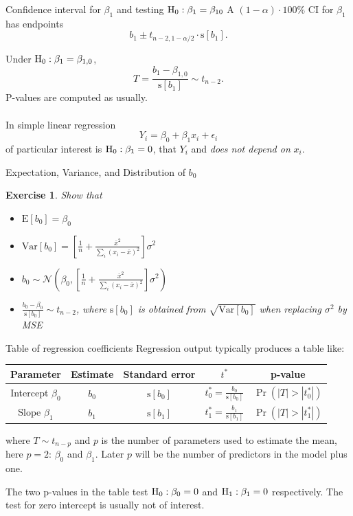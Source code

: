 \documentclass{beamer}
\newcommand{\E}{\mathrm{E}}
\newcommand{\Var}{\mathrm{Var}}
\newcommand{\s}{\mathrm{s}}
\newtheorem{exe}{Exercise}
\begin{document}
\begin{frame}{Confidence interval for $\beta_1$ and testing $\rm{H}_0:\beta_1=\beta_{10}$}
A $(1-\alpha)\cdot100\%$ CI for $\beta_1$ has endpoints
$$
b_1\pm t_{n-2,1-\alpha/2}\cdot\s[b_1].
$$

\pause Under $\rm{H}_0:\beta_1={\beta_{1,0}}$,
$$
T=\frac{b_1-\beta_{1,0}}{\s[b_1]}\sim t_{n-2}.
$$
\pause P-values are computed as usually.\\~\\

\pause In simple linear regression
$$
Y_i=\beta_0+\beta_1 x_i+\epsilon_i
$$
of particular interest is $\rm{H}_0:\beta_1=0$, that $Y_i$ and \textit{does not depend on} $x_i$. 
\end{frame}

\begin{frame}{Expectation, Variance, and Distribution of $b_0$}
\begin{exe}
Show that
\begin{itemize}
    \item $\E[b_0]=\beta_0$
    \item<2->$\Var[b_0]=\left[\frac1n+\frac{\bar{x}^2}{\sum_i(x_i-\bar{x})^2}\right]\sigma^2$
    \item<3->$b_0\sim\mathcal{N}\left(\beta_0,\left[\frac1n+\frac{\bar{x}^2}{\sum_i(x_i-\bar{x})^2}\right]\sigma^2\right)$
    \item<4->$\frac{b_0-\beta_0}{\s[b_0]}\sim t_{n-2}$, where $\s[b_0]$ is obtained from $\sqrt{\Var[b_0]}$ when replacing $\sigma^2$ by MSE
\end{itemize}
\end{exe}%
\end{frame}

\begin{frame}{Table of regression coefficients}
Regression output typically produces a table like:

\vspace{10pt}
\begin{small}
\begin{tabular}{c c c c c}
Parameter & Estimate & Standard error & $t^\ast$ & p-value\\
\hline
Intercept $\beta_0$ & $b_0$ & $\s[b_0]$ & $t^\ast_0=\frac{b_0}{\s[b_0]}$ & $\Pr(|T|>|t_0^\ast|)$\\
Slope $\beta_1$ & $b_1$ & $\s[b_1]$ & $t_1^\ast=\frac{b_1}{\s[b_1]}$ & $\Pr(|T|>|t_1^\ast|)$\\
\hline
\end{tabular}
\end{small}

\vspace{10pt}
\pause where $T\sim t_{n-p}$ and $p$ is the number of parameters used to estimate the mean, here $p=2$: $\beta_0$ and $\beta_1$. Later $p$ will be the number of predictors in the model plus one.

\vspace{10pt}
\pause The two p-values in the table test $\rm{H}_0:\beta_0=0$ and $\rm{H}_1:\beta_1=0$ respectively. The test for zero intercept is usually not of interest.
\end{frame}
\end{document}
